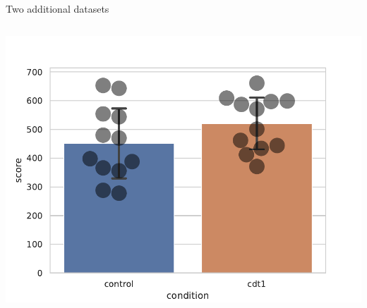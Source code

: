 \documentclass[compress]{beamer}
\begin{document}

\begin{frame}{Two additional datasets}

    \begin{columns}
        \begin{column}{0.45\linewidth}

            \includegraphics[width=\columnwidth]{code/dataset2.pdf}


\end{column}
\end{columns}
\end{frame}
\end{document}
